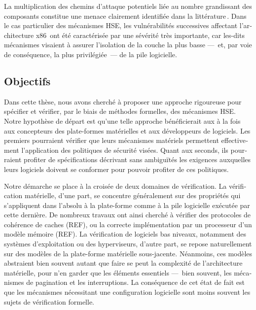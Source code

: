 \begin{otherlanguage}{french}
  La multiplication des chemins d’attaque potentiels liée au nombre grandissant
  des composants constitue une menace clairement identifiée dans la
  littérature\,\cite{wing2003compositionalattack}.
  Dans le cas particulier des mécanismes HSE, les vulnérabilités successives
  affectant l’architecture
  x86\,\cite{duflot2009smram,wojtczuk2009smram,domas2015sinkhole,kallenberg2015racecondition,kovah2015senter}
  ont été caractérisée par une sévérité très importante, car les-dits mécanismes
  visaient à assurer l’isolation de la couche la plus basse ---~et, par voie de
  conséquence, la plus privilégiée~--- de la pile logicielle.

  \subsection*{Objectifs}

  Dans cette thèse, nous avons cherché à proposer une approche rigoureuse pour
  spécifier et vérifier, par le biais de méthodes formelles, des mécanismes HSE.
  Notre hypothèse de départ est qu’une telle approche bénéficierait aux à la
  fois aux concepteurs des plate-formes matérielles et aux développeurs de
  logiciels.
  Les premiers pourraient vérifier que leurs mécanismes matériels permettent
  effectivement l’application des politiques de sécurité visées.
  Quant aux seconds, ils pourraient profiter de spécifications décrivant sans
  ambiguïtés les exigences auxquelles leurs logiciels doivent se conformer pour
  pouvoir profiter de ces politiques.

  Notre démarche se place à la croisée de deux domaines de vérification.
  La vérification matérielle, d’une part, se concentre généralement sur des
  propriétés qui s’appliquent dans l’absolu à la plate-forme comme à la pile
  logicielle exécutée par cette dernière.
  De nombreux travaux ont ainsi cherché à vérifier des protocoles de cohérence
  de caches (REF), ou la correcte implémentation par un processeur d’un modèle
  mémoire (REF).
  La vérification de logiciels bas niveaux, notamment des systèmes
  d’exploitation ou des hyperviseurs, d’autre part, se repose naturellement sur
  des modèles de la plate-forme matérielle sous-jacente.
  Néanmoins, ces modèles abstraient bien souvent autant que faire se peut la
  complexité de l’architecture matérielle, pour n’en garder que les éléments
  essentiels ---~bien souvent, les mécanismes de pagination et les
  interruptions.
  La conséquence de cet état de fait est que les mécanismes nécessitant une
  configuration logicielle sont moins souvent les sujets de vérification
  formelle.


\end{otherlanguage}
